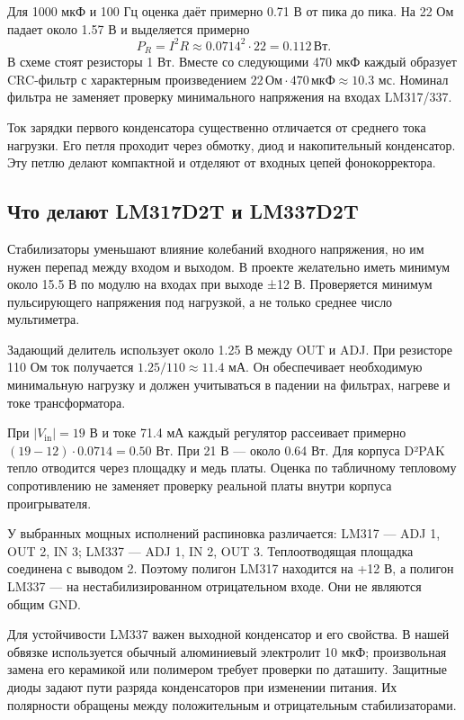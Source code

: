 \documentclass[a4paper,11pt]{article}
\newcommand{\Ohm}{\,\text{Ом}}
\newcommand{\uF}{\,\text{мкФ}}
\begin{document}
Для 1000 мкФ и 100 Гц оценка даёт примерно 0.71 В от пика до пика.
На 22 Ом падает около 1.57 В и выделяется примерно
\[
 P_R=I^2R\approx0.0714^2\cdot22=0.112\,\text{Вт}.
\]
В схеме стоят резисторы 1 Вт. Вместе со следующими 470 мкФ каждый образует
CRC-фильтр с характерным произведением $22\Ohm\cdot470\uF\approx10.3$ мс.
Номинал фильтра не заменяет проверку минимального напряжения на входах LM317/337.

Ток зарядки первого конденсатора существенно отличается от среднего тока
нагрузки. Его петля проходит через обмотку, диод и накопительный конденсатор.
Эту петлю делают компактной и отделяют от входных цепей фонокорректора.

\subsection{Что делают LM317D2T и LM337D2T}

Стабилизаторы уменьшают влияние колебаний входного напряжения, но им нужен
перепад между входом и выходом. В проекте желательно иметь минимум
около 15.5 В по модулю на входах при выходе ±12 В. Проверяется минимум
пульсирующего напряжения под нагрузкой, а не только среднее число мультиметра.

Задающий делитель использует около 1.25 В между OUT и ADJ.
При резисторе 110 Ом ток получается $1.25/110\approx11.4$ мА.
Он обеспечивает необходимую минимальную нагрузку и должен учитываться
в падении на фильтрах, нагреве и токе трансформатора.

При $|V_{\mathrm{in}}|=19$ В и токе 71.4 мА каждый регулятор рассеивает
примерно $(19-12)\cdot0.0714=0.50$ Вт. При 21 В — около 0.64 Вт.
Для корпуса D²PAK тепло отводится через площадку и медь платы.
Оценка по табличному тепловому сопротивлению не заменяет проверку реальной
платы внутри корпуса проигрывателя.

У выбранных мощных исполнений распиновка различается:
LM317 — ADJ 1, OUT 2, IN 3; LM337 — ADJ 1, IN 2, OUT 3.
Теплоотводящая площадка соединена с выводом 2. Поэтому полигон LM317 находится
на +12 В, а полигон LM337 — на нестабилизированном отрицательном входе.
Они не являются общим GND\cite{onsemi-317,onsemi-337}.

Для устойчивости LM337 важен выходной конденсатор и его свойства.
В нашей обвязке используется обычный алюминиевый электролит 10 мкФ;
произвольная замена его керамикой или полимером требует проверки по даташиту.
Защитные диоды задают пути разряда конденсаторов при изменении питания.
Их полярности обращены между положительным и отрицательным стабилизаторами.
\end{document}

